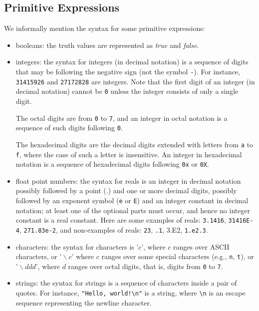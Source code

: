 \subsection{Primitive Expressions}
We informally mention the syntax for some primitive expressions:
\begin{itemize}
\item booleans: the truth values are represented as
{\it true} and {\it false}.

\item integers: the syntax for integers (in decimal notation)
is a sequence of digits that may be following the negative sign
\texttt{}
(not the symbol \texttt{-}). For instance, \texttt{31415926} and
\texttt{{}27172828} are integers. Note that the first digit
of an integer (in decimal notation) cannot be \texttt{0} unless the
integer consists of only a single digit.

The octal digits are from \texttt{0} to \texttt{7}, and an
integer in octal notation is a sequence of such digits following
\texttt{0}.

The hexadecimal digits are
the decimal digits extended with letters from
\texttt{a} to \texttt{f}, where the case of such a letter
is insensitive. An integer in hexadecimal notation is a sequence of
hexadecimal digits following \texttt{0x} or \texttt{0X}.

\item float point numbers:
the syntax for reals is an integer in decimal notation possibly followed by
a point (.) and one or more decimal digits, possibly followed by an
exponent symbol (\texttt{e} or \texttt{E}) and an integer constant in
decimal notation; at least one of the optional parts must occur, and hence
no integer constant is a real constant.  Here are some examples of reals:
\texttt{3.1416}, \texttt{31416E-4}, \texttt{271.83e-2}, and non-examples of
reals: \texttt{23}, \texttt{.1}, {3.E2}, \texttt{1.e2.3}.

\item
characters: the syntax for characters is $\texttt{'}c\texttt{'}$, where $c$
ranges over ASCII characters, or $\texttt{'}\backslash c\texttt{'}$ where
$c$ ranges over some special characters (e.g., \texttt{n}, \texttt{t}), or
$\texttt{'}\backslash ddd\texttt{'}$, where $d$ ranges over octal digits,
that is, digits from \texttt{0} to \texttt{7}.

\item
strings: the syntax for strings is a sequence of characters inside a pair
of quotes. For instance, \verb`"Hello, world!\n"` is a string, where
\verb`\n` is an escape sequence representing the newline character.


\end{itemize}

